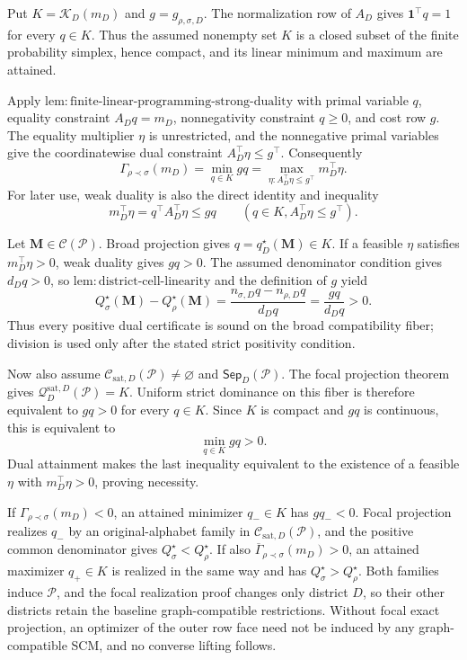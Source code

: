 Put \(K=\mathcal K_D(m_D)\) and \(g=g_{\rho,\sigma,D}\).  The normalization row of \(A_D\) gives \(\mathbf 1^\top q=1\) for every \(q\in K\).  Thus the assumed nonempty set \(K\) is a closed subset of the finite probability simplex, hence compact, and its linear minimum and maximum are attained.

Apply \(\mathrm{lem:finite\text{-}linear\text{-}programming\text{-}strong\text{-}duality}\) with primal variable \(q\), equality constraint \(A_Dq=m_D\), nonnegativity constraint \(q\geq0\), and cost row \(g\).  The equality multiplier \(\eta\) is unrestricted, and the nonnegative primal variables give the coordinatewise dual constraint \(A_D^\top\eta\leq g^\top\).  Consequently
\[
\Gamma_{\rho\prec\sigma}(m_D)
=\min_{q\in K}gq
=\max_{\eta:A_D^\top\eta\leq g^\top}m_D^\top\eta.
\]
For later use, weak duality is also the direct identity and inequality
\[
m_D^\top\eta=q^\top A_D^\top\eta\leq gq
\qquad(q\in K, A_D^\top\eta\leq g^\top).
\]

Let \(\mathbf M\in\mathcal C(\mathcal P)\).  Broad projection gives \(q=q_D^\star(\mathbf M)\in K\).  If a feasible \(\eta\) satisfies \(m_D^\top\eta>0\), weak duality gives \(gq>0\).  The assumed denominator condition gives \(d_Dq>0\), so \(\mathrm{lem:district\text{-}cell\text{-}linearity}\) and the definition of \(g\) yield
\[
Q_\sigma^\star(\mathbf M)-Q_\rho^\star(\mathbf M)
=\frac{n_{\sigma,D}q-n_{\rho,D}q}{d_Dq}
=\frac{gq}{d_Dq}>0.
\]
Thus every positive dual certificate is sound on the broad compatibility fiber; division is used only after the stated strict positivity condition.

Now also assume \(\mathcal C_{\mathrm{sat},D}(\mathcal P)\ne\varnothing\) and \(\mathsf{Sep}_D(\mathcal P)\).  The focal projection theorem gives \(\mathcal Q_D^{\mathrm{sat},D}(\mathcal P)=K\).  Uniform strict dominance on this fiber is therefore equivalent to \(gq>0\) for every \(q\in K\).  Since \(K\) is compact and \(gq\) is continuous, this is equivalent to
\[
\min_{q\in K}gq>0.
\]
Dual attainment makes the last inequality equivalent to the existence of a feasible \(\eta\) with \(m_D^\top\eta>0\), proving necessity.

If \(\Gamma_{\rho\prec\sigma}(m_D)<0\), an attained minimizer \(q_-\in K\) has \(gq_-<0\).  Focal projection realizes \(q_-\) by an original-alphabet family in \(\mathcal C_{\mathrm{sat},D}(\mathcal P)\), and the positive common denominator gives \(Q_\sigma^\star<Q_\rho^\star\).  If also \(\overline\Gamma_{\rho\prec\sigma}(m_D)>0\), an attained maximizer \(q_+\in K\) is realized in the same way and has \(Q_\sigma^\star>Q_\rho^\star\).  Both families induce \(\mathcal P\), and the focal realization proof changes only district \(D\), so their other districts retain the baseline graph-compatible restrictions.  Without focal exact projection, an optimizer of the outer row face need not be induced by any graph-compatible SCM, and no converse lifting follows.